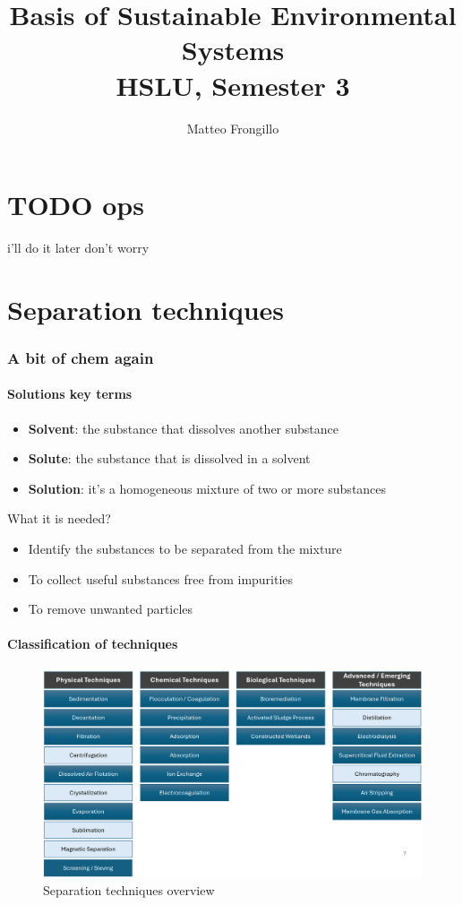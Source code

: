 \documentclass{article}
\title{\textbf{Basis of Sustainable Environmental Systems \\ HSLU, Semester 3}}
\author{Matteo Frongillo}
\begin{document}
\maketitle
\tableofcontents
\pagebreak

\part{TODO ops}
i'll do it later don't worry

\newpage
\part{Separation techniques}
\section{A bit of chem again}
\subsection{Solutions key terms}
\begin{itemize}
    \item \textbf{Solvent}: the substance that dissolves another substance 
    \item \textbf{Solute}: the substance that is dissolved in a solvent
    \item \textbf{Solution}: it's a homogeneous mixture of two or more substances
\end{itemize}

What it is needed?
\begin{itemize}
    \item Identify the substances to be separated from the mixture
    \item To collect useful substances free from impurities
    \item To remove unwanted particles
\end{itemize}

\subsection{Classification of techniques}
\begin{figure}[ht!]
    \centering
    \includegraphics[width=\textwidth]{media/techniques_overview.png}
    \caption*{Separation techniques overview}
\end{figure}
\end{document}
